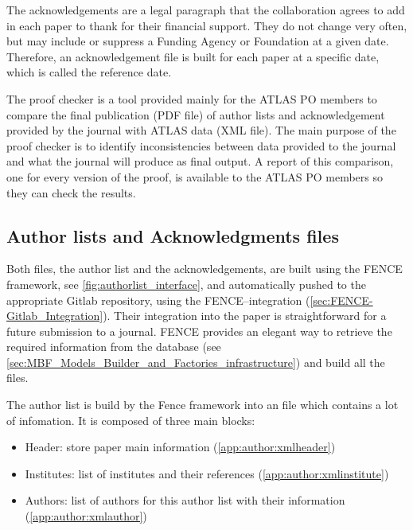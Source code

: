 The acknowledgements are a legal paragraph that the collaboration agrees to add in each paper to thank for their financial support.
They do not change very often, but may include or suppress a Funding Agency or Foundation at a given date.
Therefore, an acknowledgement file is built for each paper at a specific date, which is called the reference date.

The proof checker is a tool provided mainly for the ATLAS PO members to compare the final publication (PDF file) of author lists and acknowledgement provided by the journal with ATLAS data (XML file). The main purpose of the proof checker is to identify inconsistencies between data provided to the journal and what the journal will produce as final output. A report of this comparison, one for every version of the proof, is available to the ATLAS PO members so they can check the results.

\subsection{Author lists and Acknowledgments files}%
\label{sec:Author_lists_and_acknowledgments_files}


Both files, the author list and the acknowledgements, are built using the FENCE framework, see \cref{fig:authorlist_interface},
and automatically pushed to the appropriate Gitlab repository, using the FENCE--\gitlab integration (\cref{sec:FENCE-Gitlab_Integration}).
Their integration into the paper is straightforward for a future submission to a journal.
FENCE provides an elegant way to retrieve the required information from the database (see \cref{sec:MBF_Models_Builder_and_Factories_infrastructure}) and build all the files.

The author list is build by the Fence framework into an  file which contains a lot of infomation. It is composed of three main blocks:
\begin{itemize}
\item Header: store paper main information (\cref{app:author:xmlheader})
\item Institutes: list of institutes and their references (\cref{app:author:xmlinstitute})
\item Authors: list of authors for this author list with their information (\cref{app:author:xmlauthor})
\end{itemize}

